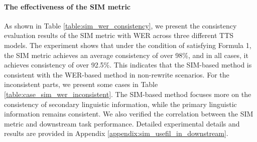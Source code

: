 \documentclass[11pt]{article}
\begin{document}
	\paragraph{The effectiveness of the SIM metric}
	As shown in Table \ref{table:sim_wer_consistency}, we present the consistency evaluation results of the SIM metric with WER across three different TTS models. The experiment shows that under the condition of satisfying Formula 1, the SIM metric achieves an average consistency of over 98\%, and in all cases, it achieves consistency of over 92.5\%. This indicates that the SIM-based method is consistent with the WER-based method in non-rewrite scenarios. For the inconsistent parts, we present some cases in Table \ref{table:case_sim_wer_inconsistent}. The SIM-based method focuses more on the consistency of secondary linguistic information, while the primary linguistic information remains consistent.
	We also verified the correlation between the SIM metric and downstream task performance. Detailed experimental details and results are provided in Appendix \ref{appendix:sim_usefil_in_downstream}.

	
	
\end{document}
